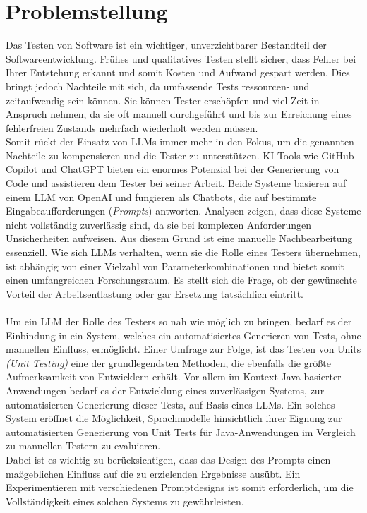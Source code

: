\section{Problemstellung}
Das Testen von Software ist ein wichtiger, unverzichtbarer Bestandteil der Softwareentwicklung. Frühes und qualitatives Testen stellt sicher, dass Fehler bei Ihrer Entstehung erkannt und somit Kosten und Aufwand gespart werden. Dies bringt jedoch Nachteile mit sich, da umfassende Tests ressourcen- und zeitaufwendig sein können. Sie können Tester erschöpfen und viel Zeit in Anspruch nehmen, da sie oft manuell durchgeführt und bis zur Erreichung eines fehlerfreien Zustands mehrfach wiederholt werden müssen. \cite{pargaonkar_study_2023}\\ Somit rückt der Einsatz von LLMs immer mehr in den Fokus, um die genannten Nachteile zu kompensieren und die Tester zu unterstützen. KI-Tools wie GitHub-Copilot und ChatGPT bieten ein enormes Potenzial bei der Generierung von Code und assistieren dem Tester bei seiner Arbeit. Beide Systeme basieren auf einem LLM von OpenAI und fungieren als Chatbots, die auf bestimmte Eingabeaufforderungen (\textit{Prompts}) antworten. Analysen zeigen, dass diese Systeme nicht vollständig zuverlässig sind, da sie bei komplexen Anforderungen Unsicherheiten aufweisen. \cite{poldrack_ai-assisted_2023} Aus diesem Grund ist eine manuelle Nachbearbeitung essenziell. Wie sich LLMs verhalten, wenn sie die Rolle eines Testers übernehmen, ist abhängig von einer Vielzahl von Parameterkombinationen und bietet somit einen umfangreichen Forschungsraum. Es stellt sich die Frage, ob der gewünschte Vorteil der Arbeitsentlastung oder gar Ersetzung tatsächlich eintritt.\\\\ Um ein LLM der Rolle des Testers so nah wie möglich zu bringen, bedarf es der Einbindung in ein System, welches ein automatisiertes Generieren von Tests, ohne manuellen Einfluss, ermöglicht. Einer Umfrage zur Folge, ist das Testen von Units \textit{(Unit Testing)} eine der grundlegendsten Methoden, die ebenfalls die größte Aufmerksamkeit von Entwicklern erhält. \cite{garousi_survey_2013} Vor allem im Kontext Java-basierter Anwendungen bedarf es der Entwicklung eines zuverlässigen Systems, zur automatisierten Generierung dieser Tests, auf Basis eines LLMs. Ein solches System eröffnet die Möglichkeit, Sprachmodelle hinsichtlich ihrer Eignung zur automatisierten Generierung von Unit Tests für Java-Anwendungen im Vergleich zu manuellen Testern zu evaluieren.\\ Dabei ist es wichtig zu berücksichtigen, dass das Design des Prompts einen maßgeblichen Einfluss auf die zu erzielenden Ergebnisse ausübt. Ein Experimentieren mit verschiedenen Promptdesigns ist somit erforderlich, um die Vollständigkeit eines solchen Systems zu gewährleisten.


